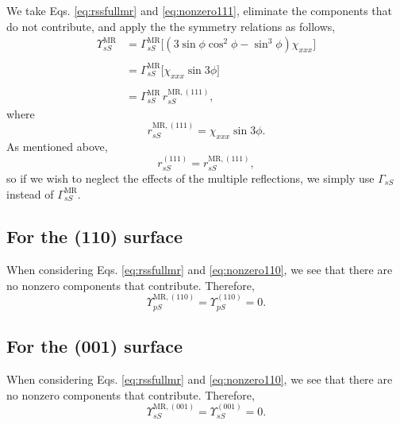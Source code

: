We take Eqs. \eqref{eq:rssfullmr} and \eqref{eq:nonzero111}, eliminate the
components that do not contribute, and apply the the symmetry relations as
follows,
\begin{equation*}
\begin{split}
\Upsilon^{\mathrm{MR}}_{sS} &= 
\Gamma^{\mathrm{MR}}_{sS}
\big[
(3\sin\phi\cos^{2}\phi - \sin^{3}\phi)\chi_{xxx}
\big]\\\\
&= 
\Gamma^{\mathrm{MR}}_{sS}
\big[
\chi_{xxx}\sin3\phi
\big]\\\\
&= \Gamma^{\mathrm{MR}}_{sS}\,r^{\mathrm{MR},(111)}_{sS},
\end{split}
\end{equation*}
where
\begin{equation}\label{eq:final-rss.mr.111}
r^{\mathrm{MR},(111)}_{sS} = \chi_{xxx}\sin3\phi.
\end{equation}
As mentioned above,
\begin{equation}\label{eq:final-rss.111}
r^{(111)}_{sS} = r^{\mathrm{MR},(111)}_{sS},
\end{equation}
so if we wish to neglect the effects of the multiple reflections, we simply use
$\Gamma_{sS}$ instead of $\Gamma^{\mathrm{MR}}_{sS}$.


\subsection{For the (110) surface}

When considering Eqs. \eqref{eq:rssfullmr} and \eqref{eq:nonzero110}, we see
that there are no nonzero components that contribute. Therefore,
\begin{equation}\label{eq:final-rss.mr.110}
\Upsilon^{\mathrm{MR},(110)}_{pS} = \Upsilon^{(110)}_{pS} = 0.
\end{equation}


\subsection{For the (001) surface}

When considering Eqs. \eqref{eq:rssfullmr} and \eqref{eq:nonzero110}, we see
that there are no nonzero components that contribute. Therefore,
\begin{equation}\label{eq:final-rss.mr.001}
\Upsilon^{\mathrm{MR},(001)}_{sS} = \Upsilon^{(001)}_{sS} = 0.
\end{equation}



